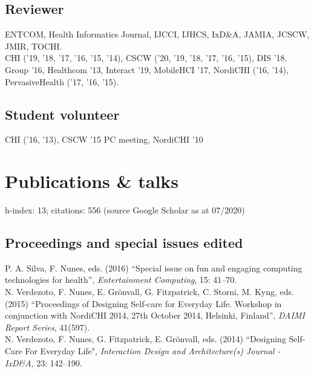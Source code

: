 \documentclass[11pt, a4paper]{article} %
\newcommand{\years}[1]{\marginnote{\scriptsize #1}} %
\begin{document}
\subsection*{Reviewer}

ENTCOM, Health Informatics Journal, IJCCI, IJHCS, IxD\&A, JAMIA, JCSCW, JMIR, TOCHI.\\
CHI ('19, '18, '17, '16, '15, '14), CSCW ('20, '19, '18, '17, '16, '15), DIS '18, Group '16, Healthcom '13, Interact '19, MobileHCI '17, NordiCHI ('16, '14), PervasiveHealth ('17, '16, '15).

\subsection*{Student volunteer}

CHI ('16, '13), CSCW '15 PC meeting, NordiCHI '10

\break





\section*{Publications \& talks}

h-index: 13; citations: 556 (source Google Scholar as at 07/2020)

\subsection*{Proceedings and special issues edited}

\years{2016}P. A. Silva, F. Nunes, eds. (2016) ``Special issue on fun and engaging computing technologies for health'', \emph{Entertainment Computing}, 15: 41--70.\\
\years{2015}N. Verdezoto, F. Nunes, E. Grönvall, G. Fitzpatrick, C. Storni, M. Kyng, eds. (2015) ``Proceedings of Designing Self-care for Everyday Life. Workshop in conjunction with NordiCHI 2014, 27th October 2014, Helsinki, Finland'', \emph{DAIMI Report Series}, 41(597).\\
\years{2014}N. Verdezoto, F. Nunes, G. Fitzpatrick, E. Grönvall, eds. (2014) ``Designing Self-Care For Everyday Life", \emph{Interaction Design and Architecture(s) Journal - IxD\&A}, 23: 142--190.
\end{document}
